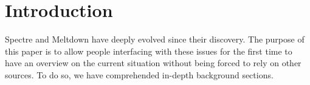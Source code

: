 \section{Introduction}
Spectre and Meltdown have deeply evolved since their discovery.
The purpose of this paper is to allow people interfacing with these issues for the first time to have an overview on the current situation without being forced to rely on other sources.
To do so, we have comprehended in-depth background sections.

